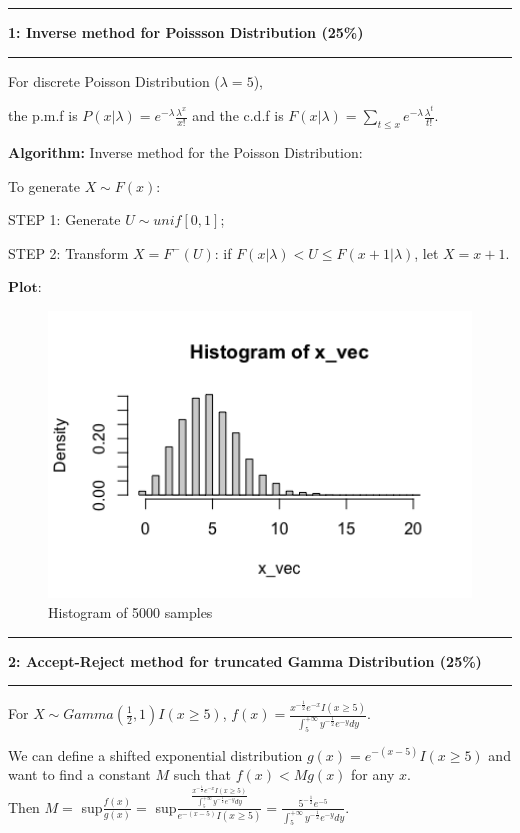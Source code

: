 \documentclass[11pt]{article}
\newcommand\question[2]{\vspace{.25in}\hrule\textbf{#1: #2}\vspace{.5em}\hrule\vspace{.10in}}
\newcommand\algorithm{\vspace{.10in}\textbf{Algorithm: }}
\begin{document}
\raggedright
\newcommand\NAME{ZHANG Xinfang}  %
\newcommand\ANDREWID{1155141566}     %
\newcommand\HWNUM{2}              %

\question{1}{Inverse method for Poissson Distribution (25\%)} 
For discrete Poisson Distribution ($\lambda = 5$),

the p.m.f is $P(x|\lambda) = e^{-\lambda} \frac{\lambda^x}{x!}$ and
the c.d.f is $F(x|\lambda) = \sum_{t \leq x} e^{-\lambda} \frac{\lambda^t}{t!}$.

\algorithm
Inverse method for the Poisson Distribution:

To generate $X \sim F(x)$:

STEP 1: Generate $U \sim unif[0, 1]$;

STEP 2: Transform $X = F^-(U)$: if $F(x|\lambda) < U \leq F(x+1|\lambda)$, let $X = x+1$.

$\mathbf{Plot:}$

\begin{figure}[H]
    \centering
    \includegraphics[width=13cm]{figures/q1_plot_new.png}
    \caption{Histogram of 5000 samples}
  \end{figure}
\question{2}{Accept-Reject method for truncated Gamma Distribution (25\%)}
For $X \sim Gamma(\frac{1}{2}, 1)I(x \geq 5)$, $f(x) = \frac{x^{-\frac{1}{2}}e^{-x}I(x\geq 5)}{\int_5^{+ \infty} y^{-\frac{1}{2}}e^{-y} dy}$.

We can define a shifted exponential distribution $g(x) = e^{-(x-5)}I(x \geq 5)$ and want to find a constant $M$ such that $f(x) < Mg(x)$ for any $x$.\\
Then $M = $ sup$ \frac{f(x)}{g(x)} = $ sup$ \frac{\frac{x^{-\frac{1}{2}}e^{-x}I(x\geq 5)}{\int_5^{+ \infty} y^{-\frac{1}{2}}e^{-y} dy}}{e^{-(x-5)}I(x \geq 5)} = \frac{5^{-\frac{1}{2}}e^{-5}}{\int_5^{+ \infty} y^{-\frac{1}{2}}e^{-y} dy}$.
\end{document}
